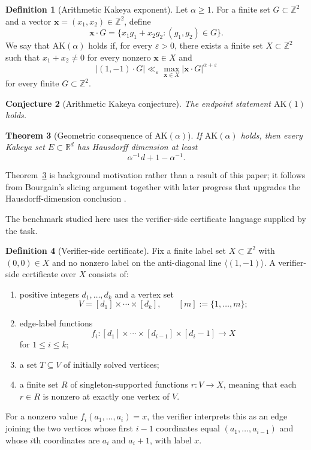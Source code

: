 \documentclass[11pt]{article}
\newtheorem{theorem}{Theorem}
\newtheorem{conjecture}[theorem]{Conjecture}
\theoremstyle{definition}
\newtheorem{definition}[theorem]{Definition}
\newcommand{\AK}{\mathrm{AK}}
\newcommand{\Z}{\mathbb{Z}}
\newcommand{\R}{\mathbb{R}}
\begin{document}
\begin{definition}[Arithmetic Kakeya exponent]
Let $\alpha\geq 1$. For a finite set $G\subset \Z^2$ and a vector $\mathbf{x}=(x_1,x_2)\in \Z^2$, define
\[
\mathbf{x}\cdot G=\{x_1g_1+x_2g_2:(g_1,g_2)\in G\}.
\]
We say that $\AK(\alpha)$ holds if, for every $\varepsilon>0$, there exists a finite set $X\subset \Z^2$ such that $x_1+x_2\neq 0$ for every nonzero $\mathbf{x}\in X$ and
\[
\lvert (1,-1)\cdot G\rvert \ll_{\varepsilon} \max_{\mathbf{x}\in X}\lvert \mathbf{x}\cdot G\rvert^{\alpha+\varepsilon}
\]
for every finite $G\subset \Z^2$.
\end{definition}

\begin{conjecture}[Arithmetic Kakeya conjecture]
\label{conj:ak}
The endpoint statement $\AK(1)$ holds.
\end{conjecture}

\begin{theorem}[Geometric consequence of $\AK(\alpha)$]
\label{thm:kakeya-dimension}
If $\AK(\alpha)$ holds, then every Kakeya set $E\subset \R^d$ has Hausdorff dimension at least
\[
\alpha^{-1}d+1-\alpha^{-1}.
\]
\end{theorem}

Theorem~\ref{thm:kakeya-dimension} is background motivation rather than a result of this paper; it follows from Bourgain's slicing argument together with later progress that upgrades the Hausdorff-dimension conclusion \citep{bourgain1999,leng2024}.

The benchmark studied here uses the verifier-side certificate language supplied by the task.

\begin{definition}[Verifier-side certificate]
Fix a finite label set $X\subset \Z^2$ with $(0,0)\in X$ and no nonzero label on the anti-diagonal line $\langle(1,-1)\rangle$. A verifier-side certificate over $X$ consists of:
\begin{enumerate}
  \item positive integers $d_1,\dots,d_k$ and a vertex set
  \[
  V=[d_1]\times \cdots \times [d_k], \qquad [m]:=\{1,\dots,m\};
  \]
  \item edge-label functions
  \[
  f_i:[d_1]\times\cdots\times[d_{i-1}]\times[d_i-1]\to X
  \]
  for $1\leq i\leq k$;
  \item a set $T\subseteq V$ of initially solved vertices;
  \item a finite set $R$ of singleton-supported functions $r:V\to X$, meaning that each $r\in R$ is nonzero at exactly one vertex of $V$.
\end{enumerate}
For a nonzero value $f_i(a_1,\dots,a_i)=x$, the verifier interprets this as an edge joining the two vertices whose first $i-1$ coordinates equal $(a_1,\dots,a_{i-1})$ and whose $i$th coordinates are $a_i$ and $a_i+1$, with label $x$.
\end{definition}
\end{document}
